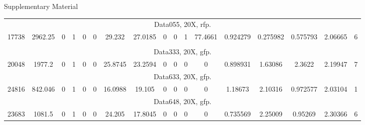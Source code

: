 \begin{wcfChaps}{Supplementary Material}
\begin{sidewaystable}
{\begin{tabular}{|c|c|c|c|c|c|c|c|c|c|c|c|c|c|c|c|c|}
\rowcolor{gray} \multicolumn{17}{|>{\columncolor[rgb]{0,1,0}}c|}{Swollen Tube}\\\hline
\multicolumn{17}{|c|}{Data055, 20X, rfp.}\\\hline 17738 & 2962.25 & 0 & 1 & 0 & 0 & 29.232 & 27.0185 & 0 & 0 & 1 & 77.4661 & 0.924279 & 0.275982 & 0.575793 & 2.06665 & 6 \\\hline

\rowcolor{gray} \multicolumn{17}{|>{\columncolor[rgb]{0,1,0}}c|}{Thin Tube}\\\hline
\multicolumn{17}{|c|}{Data333, 20X, gfp.}\\\hline 20048 & 1977.2 & 0 & 1 & 0 & 0 & 25.8745 & 23.2594 & 0 & 0 & 0 & 0 & 0.898931 & 1.63086 & 2.3622 & 2.19947 & 7 \\\hline
\multicolumn{17}{|c|}{Data633, 20X, gfp.}\\\hline 24816 & 842.046 & 0 & 1 & 0 & 0 & 16.0988 & 19.105 & 0 & 0 & 0 & 0 & 1.18673 & 2.10316 & 0.972577 & 2.03104 & 1 \\\hline
\multicolumn{17}{|c|}{Data648, 20X, gfp.}\\\hline 23683 & 1081.5 & 0 & 1 & 0 & 0 & 24.205 & 17.8045 & 0 & 0 & 0 & 0 & 0.735569 & 2.25009 & 0.95269 & 2.30366 & 6 \\\hline


\end{tabular}}
\end{sidewaystable}
\end{wcfChaps}
